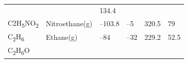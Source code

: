 \documentclass[
  9pt,
]{extbook}
\theoremstyle{definition}
\theoremstyle{definition}
\theoremstyle{definition}
\theoremstyle{remark}
\begin{document}
\begin{longtable}[]{@{}llllll@{}}
\begin{minipage}[t]{0.15\columnwidth}
\strut
\end{minipage} & \begin{minipage}[t]{0.14\columnwidth}\raggedright
\strut
\end{minipage} & \begin{minipage}[t]{0.14\columnwidth}\raggedright
134.4\strut
\end{minipage}\tabularnewline
\begin{minipage}[t]{0.07\columnwidth}\raggedright
C2H\textsubscript{5}NO\textsubscript{2}\strut
\end{minipage} & \begin{minipage}[t]{0.17\columnwidth}\raggedright
Nitroethane(g)\strut
\end{minipage} & \begin{minipage}[t]{0.15\columnwidth}\raggedright
--103.8\strut
\end{minipage} & \begin{minipage}[t]{0.15\columnwidth}\raggedright
--5\strut
\end{minipage} & \begin{minipage}[t]{0.14\columnwidth}\raggedright
320.5\strut
\end{minipage} & \begin{minipage}[t]{0.14\columnwidth}\raggedright
79\strut
\end{minipage}\tabularnewline
\begin{minipage}[t]{0.07\columnwidth}\raggedright
C\textsubscript{2}H\textsubscript{6}\strut
\end{minipage} & \begin{minipage}[t]{0.17\columnwidth}\raggedright
Ethane(g)\strut
\end{minipage} & \begin{minipage}[t]{0.15\columnwidth}\raggedright
--84\strut
\end{minipage} & \begin{minipage}[t]{0.15\columnwidth}\raggedright
--32\strut
\end{minipage} & \begin{minipage}[t]{0.14\columnwidth}\raggedright
229.2\strut
\end{minipage} & \begin{minipage}[t]{0.14\columnwidth}\raggedright
52.5\strut
\end{minipage}\tabularnewline
\begin{minipage}[t]{0.07\columnwidth}\raggedright
C\textsubscript{2}H\textsubscript{6}O\strut
\end{minipage} & \begin{minipage}[t]{0.17\columnwidth}\raggedright

\end{minipage}
\end{longtable}
\end{document}

